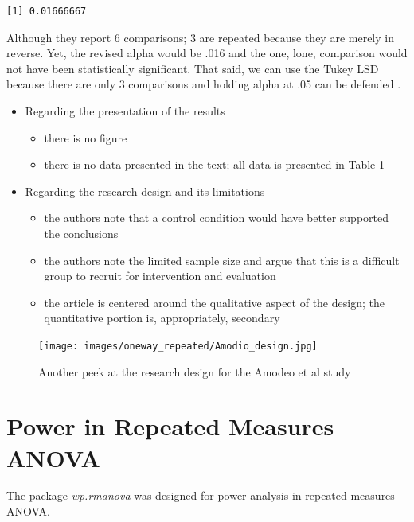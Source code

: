 \documentclass[
  11pt,
]{book}
\providecommand{\tightlist}{%
  \setlength{\itemsep}{0pt}\setlength{\parskip}{0pt}}
\begin{document}
\begin{verbatim}
[1] 0.01666667
\end{verbatim}

Although they report 6 comparisons; 3 are repeated because they are merely in reverse. Yet, the revised alpha would be .016 and the one, lone, comparison would not have been statistically significant. That said, we can use the Tukey LSD because there are only 3 comparisons and holding alpha at .05 can be defended \citep{green_using_2014}.

\begin{itemize}
\tightlist
\item
  Regarding the presentation of the results

  \begin{itemize}
  \tightlist
  \item
    there is no figure
  \item
    there is no data presented in the text; all data is presented in Table 1
  \end{itemize}
\item
  Regarding the research design and its limitations

  \begin{itemize}
  \tightlist
  \item
    the authors note that a control condition would have better supported the conclusions
  \item
    the authors note the limited sample size and argue that this is a difficult group to recruit for intervention and evaluation
  \item
    the article is centered around the qualitative aspect of the design; the quantitative portion is, appropriately, secondary
  \end{itemize}
\end{itemize}

\begin{figure}
\hypertarget{id}{%
\centering
\texttt{[image: images/oneway\_repeated/Amodio\_design.jpg]}
\caption{Another peek at the research design for the Amodeo et al study}\label{id}
}
\end{figure}

\hypertarget{power-in-repeated-measures-anova}{%
\section{Power in Repeated Measures ANOVA}\label{power-in-repeated-measures-anova}}

The package \emph{wp.rmanova} was designed for power analysis in repeated measures ANOVA.
\end{document}
